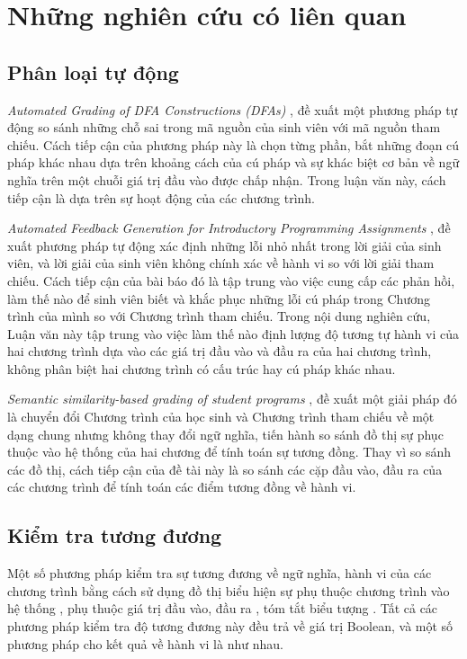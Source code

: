 \section{Những nghiên cứu có liên quan}

	\subsection*{Phân loại tự động}
	
	\textit{Automated Grading of DFA Constructions (DFAs)} \cite{alur2013automated}, đề xuất một phương pháp tự động so sánh những chỗ sai trong mã nguồn của sinh viên với mã nguồn tham chiếu. Cách tiếp cận của phương pháp này là chọn từng phần, bắt những đoạn cú pháp khác nhau dựa trên khoảng cách của cú pháp và sự khác biệt cơ bản về ngữ nghĩa trên một chuỗi giá trị đầu vào được chấp nhận. Trong luận văn này, cách tiếp cận là dựa trên sự hoạt động của các chương trình.
	
	\textit{Automated Feedback Generation for Introductory Programming Assignments} \cite{singh2013automated}, đề xuất phương pháp tự động xác định những lỗi nhỏ nhất trong lời giải của sinh viên, và lời giải của sinh viên không chính xác về hành vi so với lời giải tham chiếu. Cách tiếp cận của bài báo đó là tập trung vào việc cung cấp các phản hồi, làm thế nào để sinh viên biết và khắc phục những lỗi cú pháp trong Chương trình của mình so với Chương trình tham chiếu. Trong nội dung nghiên cứu, Luận văn này tập trung vào việc làm thế nào định lượng độ tương tự hành vi của hai chương trình dựa vào các giá trị đầu vào và đầu ra của hai chương trình, không phân biệt hai chương trình có cấu trúc hay cú pháp khác nhau.

	\textit{Semantic similarity-based grading of student programs} \cite{wang2007semantic}, đề xuất một giải pháp đó là chuyển đổi Chương trình của học sinh và Chương trình tham chiếu về một dạng chung nhưng không thay đổi ngữ nghĩa, tiến hành so sánh đồ thị sự phục thuộc vào hệ thống của hai chương để tính toán sự tương đồng. Thay vì so sánh các đồ thị, cách tiếp cận của đề tài này là so sánh các cặp đầu vào, đầu ra của các chương trình để tính toán các điểm tương đồng về hành vi. 
	
	\subsection*{Kiểm tra tương đương}
	Một số phương pháp kiểm tra sự tương đương về ngữ nghĩa, hành vi của các chương trình bằng cách sử dụng đồ thị biểu hiện sự phụ thuộc chương trình vào hệ thống \cite{bates1993incremental} \cite{binkley1992using}, phụ thuộc giá trị đầu vào, đầu ra \cite{jackson1994semantic}, tóm tắt biểu tượng \cite{person2008differential}. Tất cả các phương pháp kiểm tra độ tương đương này đều trả về giá trị Boolean, và một số phương pháp cho kết quả về hành vi là như nhau. 
	
